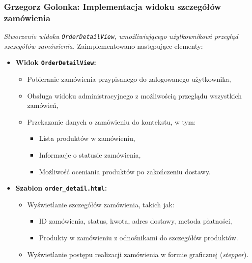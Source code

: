 \documentclass[12pt,a4paper,oneside]{article}
\theoremstyle{definition}
\numberwithin{equation}{section}
\begin{document}
\subsubsection{Grzegorz Golonka: Implementacja widoku szczegółów zamówienia}
\label{section:1.3.26}
\textit{
Stworzenie widoku \texttt{OrderDetailView}, umożliwiającego użytkownikowi przegląd szczegółów zamówienia.
}
Zaimplementowano następujące elementy:
\begin{itemize}
    \item \textbf{Widok \texttt{OrderDetailView}:}
    \begin{itemize}
        \item Pobieranie zamówienia przypisanego do zalogowanego użytkownika,
        \item Obsługa widoku administracyjnego z możliwością przeglądu wszystkich zamówień,
        \item Przekazanie danych o zamówieniu do kontekstu, w tym:
        \begin{itemize}
            \item Lista produktów w zamówieniu,
            \item Informacje o statusie zamówienia,
            \item Możliwość oceniania produktów po zakończeniu dostawy.
        \end{itemize}
    \end{itemize}
    \item \textbf{Szablon \texttt{order\_detail.html}:}
    \begin{itemize}
        \item Wyświetlanie szczegółów zamówienia, takich jak:
        \begin{itemize}
            \item ID zamówienia, status, kwota, adres dostawy, metoda płatności,
            \item Produkty w zamówieniu z odnośnikami do szczegółów produktów.
        \end{itemize}
        \item Wyświetlanie postępu realizacji zamówienia w formie graficznej (\textit{stepper}).
    \end{itemize}
\end{itemize}
% 
% 
\end{document}

